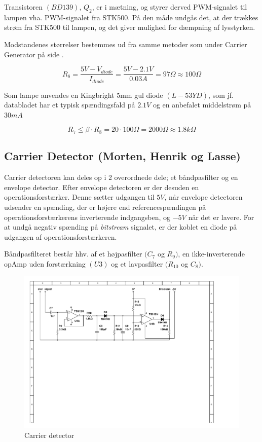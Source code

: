 Transistoren $(BD139)$\cite{lib:BD139}, $Q_{2}$, er i mætning, og styrer derved PWM-signalet til lampen vha. PWM-signalet fra STK500. På den måde undgås det, at der trækkes strøm fra STK500 til lampen, og det giver mulighed for dæmpning af lysstyrken.

Modstandenes størrelser bestemmes ud fra samme metoder som under Carrier Generator på side \pageref{subSecCarrierGen}.

\begin{displaymath}
R_{8} = \dfrac{5V-V_{diode}}{I_{diode}} = \dfrac{5V-2.1V}{0.03A} = 97\Omega \approx 100\Omega
\end{displaymath}

Som lampe anvendes en Kingbright 5mm gul diode $(L-53 YD)$\cite{lib:LED}, som jf. databladet har et typisk spændingsfald på $2.1V$ og en anbefalet middelstrøm på $30mA$

\begin{displaymath}
R_{7}\leq \beta \cdot R_{8} = 20 \cdot 100\Omega = 2000\Omega \approx 1.8k\Omega
\end{displaymath}

\subsection{Carrier Detector (Morten, Henrik og Lasse)}
Carrier detectoren kan deles op i 2 overordnede dele; et båndpasfilter og en envelope detector. Efter envelope detectoren er der desuden en operationsforstærker. Denne sætter udgangen til $5V$, når envelope detectoren udsender en spænding, der er højere end referencespændingen på operationsforstærkerens inverterende indgangsben, og $-5V$ når det er lavere. For at undgå negativ spænding på \textit{bitstream} signalet, er der koblet en diode på udgangen af operationsforstærkeren.

Båndpasfilteret består hhv. af et højpasfilter $(C_{7}$ og $R_{9})$, en ikke-inverterende opAmp uden forstærkning $(U3)$ og et lavpasfilter $(R_{10}$ og $C_{8})$.
\begin{figure}[h]
	\centering
	\includegraphics[scale=0.75, trim=40 340 240 40, clip=true]{../HardwareDesign/Diagrammer/CarrierDetector.pdf}
	\caption{Carrier detector}
	\label{fig:CarDetek}
\end{figure}

